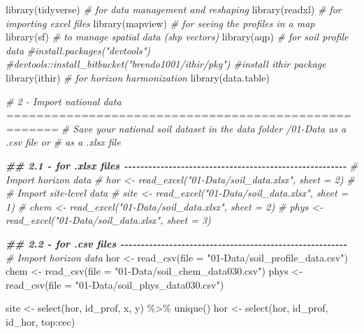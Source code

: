 \documentclass[
  10pt,
  b5paper,
  oneside]{book}
\newenvironment{Shaded}{\begin{snugshade}}{\end{snugshade}}
\newcommand{\AttributeTok}[1]{\textcolor[rgb]{0.77,0.63,0.00}{#1}}
\newcommand{\CommentTok}[1]{\textcolor[rgb]{0.56,0.35,0.01}{\textit{#1}}}
\newcommand{\DocumentationTok}[1]{\textcolor[rgb]{0.56,0.35,0.01}{\textbf{\textit{#1}}}}
\newcommand{\FunctionTok}[1]{\textcolor[rgb]{0.00,0.00,0.00}{#1}}
\newcommand{\NormalTok}[1]{#1}
\newcommand{\OtherTok}[1]{\textcolor[rgb]{0.56,0.35,0.01}{#1}}
\newcommand{\SpecialCharTok}[1]{\textcolor[rgb]{0.00,0.00,0.00}{#1}}
\newcommand{\StringTok}[1]{\textcolor[rgb]{0.31,0.60,0.02}{#1}}
\begin{document}
\begin{Shaded}
\begin{Highlighting}[]
\FunctionTok{library}\NormalTok{(tidyverse) }\CommentTok{\# for data management and reshaping}
\FunctionTok{library}\NormalTok{(readxl) }\CommentTok{\# for importing excel files}
\FunctionTok{library}\NormalTok{(mapview) }\CommentTok{\# for seeing the profiles in a map}
\FunctionTok{library}\NormalTok{(sf) }\CommentTok{\# to manage spatial data (shp vectors) }
\FunctionTok{library}\NormalTok{(aqp) }\CommentTok{\# for soil profile data}
\CommentTok{\#install.packages("devtools") }
\CommentTok{\#devtools::install\_bitbucket("brendo1001/ithir/pkg") \#install ithir package}
\FunctionTok{library}\NormalTok{(ithir) }\CommentTok{\# for horizon harmonization}
\FunctionTok{library}\NormalTok{(data.table)}

\CommentTok{\# 2 {-} Import national data =====================================================}
\CommentTok{\# Save your national soil dataset in the data folder /01{-}Data as a .csv file or }
\CommentTok{\# as a .xlsx file}

\DocumentationTok{\#\# 2.1 {-} for .xlsx files {-}{-}{-}{-}{-}{-}{-}{-}{-}{-}{-}{-}{-}{-}{-}{-}{-}{-}{-}{-}{-}{-}{-}{-}{-}{-}{-}{-}{-}{-}{-}{-}{-}{-}{-}{-}{-}{-}{-}{-}{-}{-}{-}{-}{-}{-}{-}{-}{-}{-}{-}{-}{-}{-}{-}}
\CommentTok{\# Import horizon data }
\CommentTok{\# hor \textless{}{-} read\_excel("01{-}Data/soil\_data.xlsx", sheet = 2)}
\CommentTok{\# \# Import site{-}level data}
\CommentTok{\# site \textless{}{-} read\_excel("01{-}Data/soil\_data.xlsx", sheet = 1)}
\CommentTok{\# chem \textless{}{-} read\_excel("01{-}Data/soil\_data.xlsx", sheet = 2)}
\CommentTok{\# phys \textless{}{-} read\_excel("01{-}Data/soil\_data.xlsx", sheet = 3)}


\DocumentationTok{\#\# 2.2 {-} for .csv files {-}{-}{-}{-}{-}{-}{-}{-}{-}{-}{-}{-}{-}{-}{-}{-}{-}{-}{-}{-}{-}{-}{-}{-}{-}{-}{-}{-}{-}{-}{-}{-}{-}{-}{-}{-}{-}{-}{-}{-}{-}{-}{-}{-}{-}{-}{-}{-}{-}{-}{-}{-}{-}{-}{-}{-}}
\CommentTok{\# Import horizon data }
\NormalTok{hor }\OtherTok{\textless{}{-}} \FunctionTok{read\_csv}\NormalTok{(}\AttributeTok{file =} \StringTok{"01{-}Data/soil\_profile\_data.csv"}\NormalTok{)}
\NormalTok{chem }\OtherTok{\textless{}{-}} \FunctionTok{read\_csv}\NormalTok{(}\AttributeTok{file =} \StringTok{"01{-}Data/soil\_chem\_data030.csv"}\NormalTok{)}
\NormalTok{phys }\OtherTok{\textless{}{-}} \FunctionTok{read\_csv}\NormalTok{(}\AttributeTok{file =} \StringTok{"01{-}Data/soil\_phys\_data030.csv"}\NormalTok{)}


\NormalTok{site }\OtherTok{\textless{}{-}} \FunctionTok{select}\NormalTok{(hor, id\_prof, x, y) }\SpecialCharTok{\%\textgreater{}\%} \FunctionTok{unique}\NormalTok{()}
\NormalTok{hor }\OtherTok{\textless{}{-}} \FunctionTok{select}\NormalTok{(hor, id\_prof, id\_hor, top}\SpecialCharTok{:}\NormalTok{cec)}


\end{Highlighting}
\end{Shaded}
\end{document}
